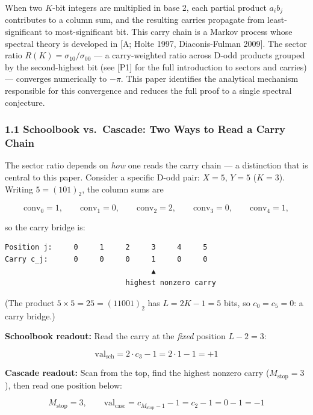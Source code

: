 \documentclass[
  11pt,
]{article}
\begin{document}
When two \(K\)-bit integers are multiplied in base 2, each partial product
\(a_i b_j\) contributes to a column sum, and the resulting carries propagate
from least-significant to most-significant bit. This carry chain is a Markov
process whose spectral theory is developed in {[}A; Holte 1997, Diaconis-Fulman
2009{]}. The sector ratio \(R(K) = \sigma_{10}/\sigma_{00}\) --- a
carry-weighted ratio across D-odd products grouped by the second-highest bit
(see {[}P1{]} for the full introduction to sectors and carries) --- converges
numerically to \(-\pi\). This paper identifies the analytical mechanism
responsible for this convergence and reduces the full proof to a single spectral
conjecture.

\subsubsection{1.1 Schoolbook vs.~Cascade: Two Ways to Read a Carry
Chain}\label{schoolbook-vs.-cascade-two-ways-to-read-a-carry-chain}

The sector ratio depends on \emph{how} one reads the carry chain --- a
distinction that is central to this paper. Consider a specific D-odd pair:
\(X = 5\), \(Y = 5\) (\(K = 3\)). Writing \(5 = (101)_2\), the column sums are

\[\mathrm{conv}_0 = 1, \qquad \mathrm{conv}_1 = 0, \qquad \mathrm{conv}_2 = 2, \qquad \mathrm{conv}_3 = 0, \qquad \mathrm{conv}_4 = 1,\]

so the carry bridge is:

\begin{verbatim}
Position j:     0     1     2     3     4     5
Carry c_j:      0     0     0     1     0     0
                                  ▲
                            highest nonzero carry
\end{verbatim}

(The product \(5 \times 5 = 25 = (11001)_2\) has \(L = 2K - 1 = 5\) bits, so
\(c_0 = c_5 = 0\): a carry bridge.)

\textbf{Schoolbook readout:} Read the carry at the \emph{fixed} position
\(L - 2 = 3\):

\[\mathrm{val}_{\mathrm{sch}} = 2 \cdot c_3 - 1 = 2 \cdot 1 - 1 = +1\]

\textbf{Cascade readout:} Scan from the top, find the highest nonzero carry
(\(M_{\mathrm{stop}} = 3\)), then read one position below:

\[M_{\mathrm{stop}} = 3, \qquad \mathrm{val}_{\mathrm{casc}} = c_{M_{\mathrm{stop}} - 1} - 1 = c_2 - 1 = 0 - 1 = -1\]
\end{document}
